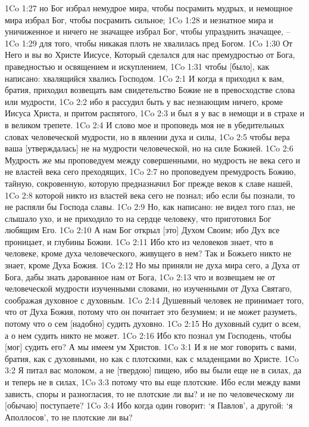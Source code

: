 1Co 1:27  но Бог избрал немудрое мира, чтобы посрамить мудрых, и немощное мира избрал Бог, чтобы посрамить сильное;
1Co 1:28  и незнатное мира и уничиженное и ничего не значащее избрал Бог, чтобы упразднить значащее, --
1Co 1:29  для того, чтобы никакая плоть не хвалилась пред Богом.
1Co 1:30  От Него и вы во Христе Иисусе, Который сделался для нас премудростью от Бога, праведностью и освящением и искуплением,
1Co 1:31  чтобы [было], как написано: хвалящийся хвались Господом.
1Co 2:1  И когда я приходил к вам, братия, приходил возвещать вам свидетельство Божие не в превосходстве слова или мудрости,
1Co 2:2  ибо я рассудил быть у вас незнающим ничего, кроме Иисуса Христа, и притом распятого,
1Co 2:3  и был я у вас в немощи и в страхе и в великом трепете.
1Co 2:4  И слово мое и проповедь моя не в убедительных словах человеческой мудрости, но в явлении духа и силы,
1Co 2:5  чтобы вера ваша [утверждалась] не на мудрости человеческой, но на силе Божией.
1Co 2:6  Мудрость же мы проповедуем между совершенными, но мудрость не века сего и не властей века сего преходящих,
1Co 2:7  но проповедуем премудрость Божию, тайную, сокровенную, которую предназначил Бог прежде веков к славе нашей,
1Co 2:8  которой никто из властей века сего не познал; ибо если бы познали, то не распяли бы Господа славы.
1Co 2:9  Но, как написано: не видел того глаз, не слышало ухо, и не приходило то на сердце человеку, что приготовил Бог любящим Его.
1Co 2:10  А нам Бог открыл [это] Духом Своим; ибо Дух все проницает, и глубины Божии.
1Co 2:11  Ибо кто из человеков знает, что в человеке, кроме духа человеческого, живущего в нем? Так и Божьего никто не знает, кроме Духа Божия.
1Co 2:12  Но мы приняли не духа мира сего, а Духа от Бога, дабы знать дарованное нам от Бога,
1Co 2:13  что и возвещаем не от человеческой мудрости изученными словами, но изученными от Духа Святаго, соображая духовное с духовным.
1Co 2:14  Душевный человек не принимает того, что от Духа Божия, потому что он почитает это безумием; и не может разуметь, потому что о сем [надобно] судить духовно.
1Co 2:15  Но духовный судит о всем, а о нем судить никто не может.
1Co 2:16  Ибо кто познал ум Господень, чтобы [мог] судить его? А мы имеем ум Христов.
1Co 3:1  И я не мог говорить с вами, братия, как с духовными, но как с плотскими, как с младенцами во Христе.
1Co 3:2  Я питал вас молоком, а не [твердою] пищею, ибо вы были еще не в силах, да и теперь не в силах,
1Co 3:3  потому что вы еще плотские. Ибо если между вами зависть, споры и разногласия, то не плотские ли вы? и не по человеческому ли [обычаю] поступаете?
1Co 3:4  Ибо когда один говорит: `я Павлов', а другой: `я Аполлосов', то не плотские ли вы?
